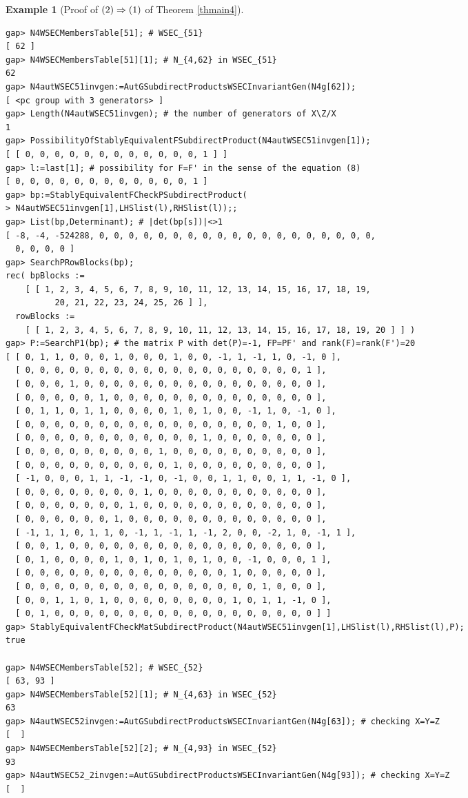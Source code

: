 \documentclass{amsart}
\theoremstyle{plain}
\theoremstyle{definition}
\newtheorem{example}[theorem]{Example}
\theoremstyle{remark}
\begin{document}
\begin{example}[Proof of ${\rm (2)}\Rightarrow {\rm (1)}$ of {Theorem \ref{thmain4}}]
\begin{verbatim}
gap> N4WSECMembersTable[51]; # WSEC_{51}
[ 62 ]
gap> N4WSECMembersTable[51][1]; # N_{4,62} in WSEC_{51}
62
gap> N4autWSEC51invgen:=AutGSubdirectProductsWSECInvariantGen(N4g[62]);
[ <pc group with 3 generators> ]
gap> Length(N4autWSEC51invgen); # the number of generators of X\Z/X
1
gap> PossibilityOfStablyEquivalentFSubdirectProduct(N4autWSEC51invgen[1]);
[ [ 0, 0, 0, 0, 0, 0, 0, 0, 0, 0, 0, 0, 1 ] ]
gap> l:=last[1]; # possibility for F=F' in the sense of the equation (8)
[ 0, 0, 0, 0, 0, 0, 0, 0, 0, 0, 0, 0, 1 ]
gap> bp:=StablyEquivalentFCheckPSubdirectProduct(
> N4autWSEC51invgen[1],LHSlist(l),RHSlist(l));;
gap> List(bp,Determinant); # |det(bp[s])|<>1
[ -8, -4, -524288, 0, 0, 0, 0, 0, 0, 0, 0, 0, 0, 0, 0, 0, 0, 0, 0, 0, 0, 0, 
  0, 0, 0, 0 ]
gap> SearchPRowBlocks(bp);
rec( bpBlocks := 
    [ [ 1, 2, 3, 4, 5, 6, 7, 8, 9, 10, 11, 12, 13, 14, 15, 16, 17, 18, 19, 
          20, 21, 22, 23, 24, 25, 26 ] ], 
  rowBlocks := 
    [ [ 1, 2, 3, 4, 5, 6, 7, 8, 9, 10, 11, 12, 13, 14, 15, 16, 17, 18, 19, 20 ] ] )
gap> P:=SearchP1(bp); # the matrix P with det(P)=-1, FP=PF' and rank(F)=rank(F')=20
[ [ 0, 1, 1, 0, 0, 0, 1, 0, 0, 0, 1, 0, 0, -1, 1, -1, 1, 0, -1, 0 ], 
  [ 0, 0, 0, 0, 0, 0, 0, 0, 0, 0, 0, 0, 0, 0, 0, 0, 0, 0, 0, 1 ], 
  [ 0, 0, 0, 1, 0, 0, 0, 0, 0, 0, 0, 0, 0, 0, 0, 0, 0, 0, 0, 0 ], 
  [ 0, 0, 0, 0, 0, 1, 0, 0, 0, 0, 0, 0, 0, 0, 0, 0, 0, 0, 0, 0 ], 
  [ 0, 1, 1, 0, 1, 1, 0, 0, 0, 0, 1, 0, 1, 0, 0, -1, 1, 0, -1, 0 ], 
  [ 0, 0, 0, 0, 0, 0, 0, 0, 0, 0, 0, 0, 0, 0, 0, 0, 0, 1, 0, 0 ], 
  [ 0, 0, 0, 0, 0, 0, 0, 0, 0, 0, 0, 0, 1, 0, 0, 0, 0, 0, 0, 0 ], 
  [ 0, 0, 0, 0, 0, 0, 0, 0, 0, 1, 0, 0, 0, 0, 0, 0, 0, 0, 0, 0 ], 
  [ 0, 0, 0, 0, 0, 0, 0, 0, 0, 0, 1, 0, 0, 0, 0, 0, 0, 0, 0, 0 ], 
  [ -1, 0, 0, 0, 1, 1, -1, -1, 0, -1, 0, 0, 1, 1, 0, 0, 1, 1, -1, 0 ], 
  [ 0, 0, 0, 0, 0, 0, 0, 0, 1, 0, 0, 0, 0, 0, 0, 0, 0, 0, 0, 0 ], 
  [ 0, 0, 0, 0, 0, 0, 0, 1, 0, 0, 0, 0, 0, 0, 0, 0, 0, 0, 0, 0 ], 
  [ 0, 0, 0, 0, 0, 0, 1, 0, 0, 0, 0, 0, 0, 0, 0, 0, 0, 0, 0, 0 ], 
  [ -1, 1, 1, 0, 1, 1, 0, -1, 1, -1, 1, -1, 2, 0, 0, -2, 1, 0, -1, 1 ], 
  [ 0, 0, 1, 0, 0, 0, 0, 0, 0, 0, 0, 0, 0, 0, 0, 0, 0, 0, 0, 0 ], 
  [ 0, 1, 0, 0, 0, 0, 1, 0, 1, 0, 1, 0, 1, 0, 0, -1, 0, 0, 0, 1 ], 
  [ 0, 0, 0, 0, 0, 0, 0, 0, 0, 0, 0, 0, 0, 0, 1, 0, 0, 0, 0, 0 ], 
  [ 0, 0, 0, 0, 0, 0, 0, 0, 0, 0, 0, 0, 0, 0, 0, 0, 1, 0, 0, 0 ], 
  [ 0, 0, 1, 1, 0, 1, 0, 0, 0, 0, 0, 0, 0, 0, 1, 0, 1, 1, -1, 0 ], 
  [ 0, 1, 0, 0, 0, 0, 0, 0, 0, 0, 0, 0, 0, 0, 0, 0, 0, 0, 0, 0 ] ]
gap> StablyEquivalentFCheckMatSubdirectProduct(N4autWSEC51invgen[1],LHSlist(l),RHSlist(l),P);
true

gap> N4WSECMembersTable[52]; # WSEC_{52}
[ 63, 93 ]
gap> N4WSECMembersTable[52][1]; # N_{4,63} in WSEC_{52}
63
gap> N4autWSEC52invgen:=AutGSubdirectProductsWSECInvariantGen(N4g[63]); # checking X=Y=Z
[  ]
gap> N4WSECMembersTable[52][2]; # N_{4,93} in WSEC_{52}
93
gap> N4autWSEC52_2invgen:=AutGSubdirectProductsWSECInvariantGen(N4g[93]); # checking X=Y=Z
[  ]


\end{verbatim}
\end{example}
\end{document}
